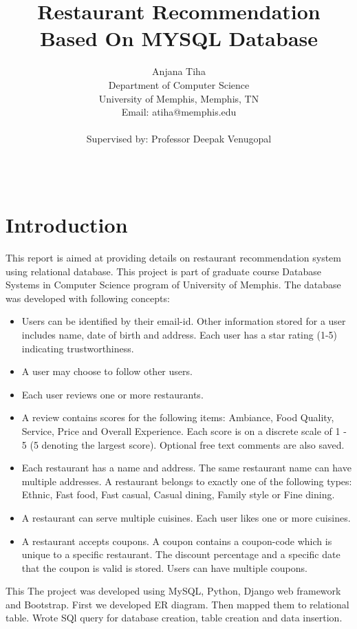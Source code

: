 \documentclass[12pt]{report}
\begin{document}
\title{Restaurant Recommendation Based On MYSQL Database}
\author{Anjana Tiha\\
Department of Computer Science\\
University of Memphis, Memphis, TN\\
Email: atiha@memphis.edu\\\\
Supervised by: Professor Deepak Venugopal\\\\\\}
\maketitle
\section*{Introduction}
This report is aimed at providing details on restaurant recommendation system using relational database. This project is part of graduate course Database Systems in Computer Science program of University of Memphis. 
The database was developed with following concepts:
\begin{itemize}
\item Users can be identified by their email-id. Other information stored for a user includes
name, date of birth and address. Each user has a star rating (1-5) indicating trustworthiness.
\item A user may choose to follow other users.
\item Each user reviews one or more restaurants.
\item A review contains scores for the following items: Ambiance, Food Quality, Service,
Price and Overall Experience. Each score is on a discrete scale of 1 - 5 (5 denoting the
largest score). Optional free text comments are also saved.
\item Each restaurant has a name and address. The same restaurant name can have multiple
addresses. A restaurant belongs to exactly one of the following types: Ethnic, Fast
food, Fast casual, Casual dining, Family style or Fine dining.
\item A restaurant can serve multiple cuisines. Each user likes one or more cuisines.
\item A restaurant accepts coupons. A coupon contains a coupon-code which is unique to
a specific restaurant. The discount percentage and a specific date that the coupon is
valid is stored. Users can have multiple coupons.
\end{itemize}
This   The project was developed using MySQL, Python, Django web framework and Bootstrap. First we developed ER diagram. Then mapped them to relational table. Wrote SQl query for database creation, table creation and data insertion. 
\newpage
\end{document}
